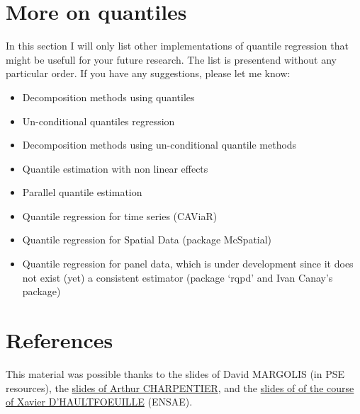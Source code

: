 \documentclass[]{book}
\providecommand{\tightlist}{%
  \setlength{\itemsep}{0pt}\setlength{\parskip}{0pt}}
\begin{document}
\section{More on quantiles}\label{more-on-quantiles}

In this section I will only list other implementations of quantile
regression that might be usefull for your future research. The list is
presentend without any particular order. If you have any suggestions,
please let me know:

\begin{itemize}
\tightlist
\item
  Decomposition methods using quantiles
  \citep{machado2005counterfactual}
\item
  Un-conditional quantiles regression \citep{firpo2009unconditional}
\item
  Decomposition methods using un-conditional quantile methods
  \citep{firpo2018decomposing}
\item
  Quantile estimation with non linear effects
\item
  Parallel quantile estimation
\item
  Quantile regression for time series (CAViaR)
\item
  Quantile regression for Spatial Data (package McSpatial)
\item
  Quantile regression for panel data, which is under development since
  it does not exist (yet) a consistent estimator (package `rqpd' and
  Ivan Canay's package)
\end{itemize}

\section{References}\label{references}

This material was possible thanks to the slides of David MARGOLIS (in
PSE resources), the
\href{https://freakonometrics.hypotheses.org/files/2017/05/erasmus-1.pdf}{slides
of Arthur CHARPENTIER}, and the
\href{http://www.crest.fr/ckfinder/userfiles/files/Pageperso/xdhaultfoeuille/course_qreg.pdf}{slides
of of the course of Xavier D'HAULTFOEUILLE} (ENSAE).


\end{document}
